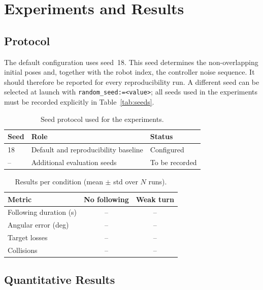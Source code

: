 \documentclass[conference]{IEEEtran}
\begin{document}
\section{Experiments and Results}

\subsection{Protocol}

The default configuration uses seed~18. This seed determines the
non-overlapping initial poses and, together with the robot index, the
controller noise sequence. It should therefore be reported for every
reproducibility run. A different seed can be selected at launch with
\texttt{random\_seed:=<value>}; all seeds used in the experiments must be
recorded explicitly in Table~\ref{tab:seeds}.

\begin{table}[t]
    \centering
    \caption{Seed protocol used for the experiments.}
    \label{tab:seed-protocol}
    \begin{tabular}{lll}
        \toprule
        Seed & Role & Status \\
        \midrule
        18 & Default and reproducibility baseline & Configured \\
        -- & Additional evaluation seeds & To be recorded \\
        \bottomrule
    \end{tabular}
\end{table}

\begin{table}[t]
    \centering
    \caption{Results per condition (mean $\pm$ std over $N$ runs).}
    \label{tab:results}
    \begin{tabular}{lcc}
        \toprule
        Metric & No following & Weak turn \\
        \midrule
        Following duration (s) & -- & -- \\
        Angular error (deg)    & -- & -- \\
        Target losses          & -- & -- \\
        Collisions             & -- & -- \\
        \bottomrule
    \end{tabular}
\end{table}

\subsection{Quantitative Results}
\end{document}
